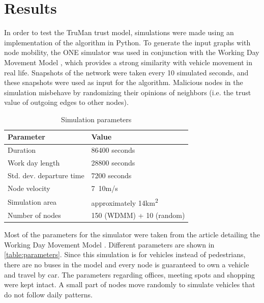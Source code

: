 \documentclass[conference]{IEEEtran}
\begin{document}
\section{Results}
\label{section:results}

In order to test the TruMan trust model, simulations were made using an implementation of the algorithm in Python.
To generate the input graphs with node mobility, the ONE simulator \cite{keranen2009one} was used in conjunction with the Working Day Movement Model \cite{ekman2008working}, which provides a strong similarity with vehicle movement in real life.
Snapshots of the network were taken every 10 simulated seconds, and these snapshots were used as input for the algorithm.
Malicious nodes in the simulation misbehave by randomizing their opinions of neighbors (i.e. the trust value of outgoing edges to other nodes).

\begin{table}[h!]
\caption{Simulation parameters}
\label{table:parameters}
\centering
\begin{tabular}{|p{3cm}||p{3.5cm}|}
 \hline
 \textbf{Parameter}	& \textbf{Value} \\
 \hline
 \hline
 Duration 			& 86400 seconds \\
 \hline
 Work day length 	& 28800 seconds \\
 \hline
 Std. dev. departure time & 7200 seconds \\
 \hline
 Node velocity 		& 7~10m/s \\
 \hline
 Simulation area	& approximately 14km\textsuperscript{2} \\
 \hline
 Number of nodes 	& 150 (WDMM) + 10 (random) \\
 \hline
\end{tabular}
\end{table}

Most of the parameters for the simulator were taken from the article detailing the Working Day Movement Model \cite{ekman2008working}.
Different parameters are shown in \autoref{table:parameters}.
Since this simulation is for vehicles instead of pedestrians, there are no buses in the model and every node is guaranteed to own a vehicle and travel by car.
The parameters regarding offices, meeting spots and shopping were kept intact.
A small part of nodes move randomly to simulate vehicles that do not follow daily patterns.
\end{document}
